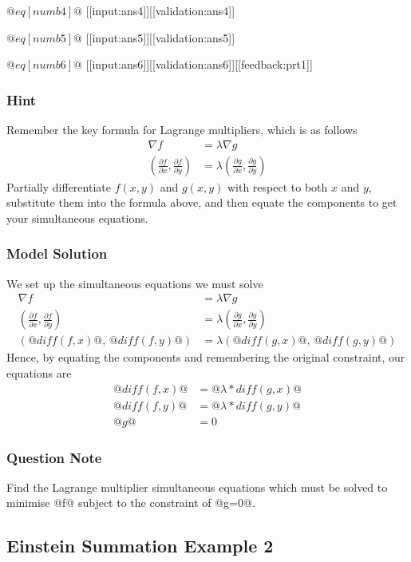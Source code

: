 \documentclass[a4paper,10pt]{article}
\begin{document}
\( @eq[numb4]@ \)   [[input:ans4]][[validation:ans4]]

\( @eq[numb5]@ \)   [[input:ans5]][[validation:ans5]]

\( @eq[numb6]@ \)   [[input:ans6]][[validation:ans6]][[feedback:prt1]]
\subsubsection{Hint}
Remember the key formula for Lagrange multipliers, which is as follows \begin{align*} \nabla f &= \lambda \nabla g \\ \left(\frac{\partial f}{\partial x},\frac{\partial f}{\partial y} \right) &= \lambda \left( \frac{\partial g}{\partial x}, \frac{\partial g}{\partial y} \right) \end{align*} Partially differentiate \(f(x,y)\) and \(g(x,y)\) with respect to both \(x\) and \(y\), substitute them into the formula above, and then equate the components to get your simultaneous equations.
\subsubsection{Model Solution}
We set up the simultaneous equations we must solve \begin{align*} \nabla f &= \lambda \nabla g \\ \left( \frac{\partial f}{\partial x}, \frac{\partial f}{\partial y} \right) &= \lambda \left( \frac{\partial g}{\partial x}, \frac{\partial g}{\partial y} \right) \\ \left( @diff(f,x)@, \,  @diff(f,y)@ \right) &= \lambda \left( @diff(g,x)@, \,   @diff(g,y)@ \right) \end{align*} Hence, by equating the components and remembering the original constraint, our equations are \begin{align*} @diff(f,x)@ &= @\lambda * diff(g,x)@ \\ @diff(f,y)@ &= @\lambda * diff(g,y)@ \\ @g@ &= 0 \end{align*}
\subsubsection{Question Note}
Find the Lagrange multiplier simultaneous equations which must be solved to minimise @f@ subject to the constraint of @g=0@.

\subsection{Einstein Summation Example 2}
\end{document}
